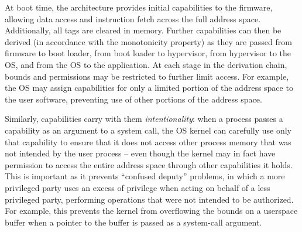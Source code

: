 \documentclass[12pt,twoside,openright,a4paper]{article}
\newcommand{\note}[2]{{\color{blue}[ Note: #1 - #2]}}
\renewcommand{\note}[2]{\relax\ifhmode\unskip\fi}
\newcommand{\rwnote}[1]{\note{#1}{Robert W.}}
\newcommand{\psnote}[1]{\note{#1}{Peter S.}}
\newcommand{\pgnnote}[1]{\note{#1}{Peter N.}}
\begin{document}
\begin{description}
  
\end{description}

At boot time, the architecture provides initial capabilities to the firmware,
allowing data access and instruction fetch across the full address space.
Additionally, all tags are cleared in memory.
Further capabilities can then be derived (in accordance with the monotonicity
property) as they are passed from firmware to boot loader, from boot loader to
hypervisor, from hypervisor to the OS, and from the OS to the application.
At each stage in the derivation chain, bounds and permissions may be
restricted to further limit access.
For example, the OS may assign capabilities for only a limited portion of the
address space to the user software, preventing use of other portions of the
address space.



Similarly, capabilities carry with them \textit{intentionality}: when a
process passes a capability as an argument to a system call, the OS kernel can
carefully use only that capability to ensure that it does not access other
process memory that was not intended by the user process -- even though the
kernel may in fact have permission to access the entire address space through
other capabilities it holds.
This is important as it prevents ``confused deputy'' problems, in which a more
privileged party uses an excess of privilege when acting on behalf of a less
privileged party, performing operations that were not intended to be
authorized.
For example, this prevents the kernel from overflowing the bounds on a
userspace buffer when a pointer to the buffer is passed as a
system-call argument.
\end{document}
